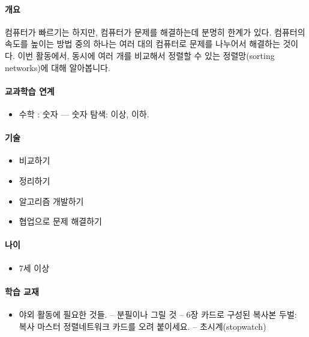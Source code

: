 \documentclass[]{article}
\begin{document}
\mbox{}\paragraph{개요}\label{section-112}

컴퓨터가 빠르기는 하지만, 컴퓨터가 문제를 해결하는데 분명히 한계가 있다.
컴퓨터의 속도를 높이는 방법 중의 하나는 여러 대의 컴퓨터로 문제를
나누어서 해결하는 것이다. 이번 활동에서, 동시에 여러 개를 비교해서
정렬할 수 있는 정렬망(sorting networks)에 대해 알아봅니다.

\mbox{}\paragraph{교과학습 연계}\label{section-113}

\begin{itemize}
\itemsep1pt\parskip0pt
\item
  수학 : 숫자 --- 숫자 탐색: 이상, 이하.
\end{itemize}

\mbox{}\paragraph{기술}\label{section-114}

\begin{itemize}
\itemsep1pt\parskip0pt
\item
  비교하기
\item
  정리하기
\item
  알고리즘 개발하기
\item
  협업으로 문제 해결하기
\end{itemize}

\mbox{}\paragraph{나이}\label{section-115}

\begin{itemize}
\itemsep1pt\parskip0pt
\item
  7세 이상
\end{itemize}

\mbox{}\paragraph{학습 교재}\label{section-116}

\begin{itemize}
\itemsep1pt\parskip0pt
\item
  야외 활동에 필요한 것들. -- 분필이나 그릴 것 -- 6장 카드로 구성된
  복사본 두벌: 복사 마스터 정렬네트워크 카드를 오려 붙이세요. --
  초시계(stopwatch)
\end{itemize}
\end{document}
